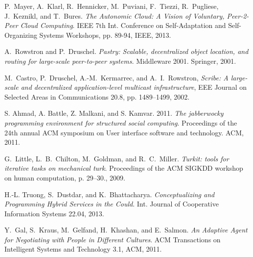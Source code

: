 \documentclass{llncs}
\begin{document}
\begin{thebibliography}{1}
P.~Mayer, A.~Klarl, R.~Hennicker, M.~Puviani, F.~Tiezzi, R.~Pugliese, J.~Keznikl, and T.~Bures. \emph{The Autonomic Cloud: A Vision of Voluntary, Peer-2-Peer Cloud Computing}. IEEE 7th Int. Conference on Self-Adaptation and Self-Organizing Systems Workshops, pp. 89-94, IEEE, 2013.

A.~Rowstron and P.~Druschel. \emph{Pastry: Scalable, decentralized object location, and routing for large-scale peer-to-peer systems.} Middleware 2001. Springer, 2001.

M.~Castro, P.~Druschel, A.-M.~Kermarrec, and A.~I.~Rowstron, \emph{Scribe: A large-scale and decentralized application-level multicast infrastructure}, EEE Journal on Selected Areas in Communications 20.8, pp. 1489--1499, 2002.

S. Ahmad, A. Battle, Z. Malkani, and S. Kamvar. 2011. \emph{The jabberwocky programming environment for structured social computing}. Proceedings of the 24th annual ACM symposium on User interface software and technology. ACM, 2011.

G.~Little, L.~B.~Chilton, M.~Goldman, and R.~C.~Miller. \emph{Turkit: tools for iterative tasks on mechanical turk}. Proceedings of the ACM SIGKDD workshop on human computation, p. 29--30., 2009.

 H.-L. Truong, S.~Dustdar, and K.~Bhattacharya. \emph{Conceptualizing and Programming Hybrid Services in the Could}. Int. Journal of Cooperative Information Systems 22.04, 2013. 

Y.~Gal, S.~Kraus, M.~Gelfand, H.~Khashan, and E.~Salmon. \emph{An Adaptive Agent for Negotiating with People in Different Cultures}. ACM Transactions on Intelligent Systems and Technology 3.1, ACM, 2011. 

\end{thebibliography}
\end{document}
